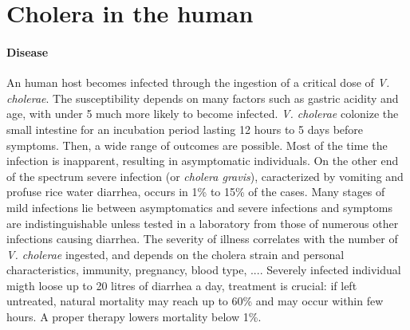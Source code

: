 \section{Cholera in the human} 
\paragraph{Disease} An human host becomes infected through the ingestion of a critical dose of \emph{V. cholerae}\cite{Kaper:Cholera:1995,Nelson:CholeraTransmissionHost:2009}. The susceptibility depends on many factors such as gastric acidity and age, with under 5 much more likely to become infected\cite{Sack:Cholera:2004}. \textit{V. cholerae} colonize the small intestine for an incubation period lasting 12 hours to 5 days\cite{Azman:IncubationPeriodCholera:2013} before symptoms. Then, a wide range of outcomes are possible. Most of the time the infection is inapparent, resulting in asymptomatic individuals. On the other end of the spectrum severe infection (or \emph{cholera gravis}), caracterized by vomiting and profuse rice water diarrhea, occurs in 1\% to 15\% of the cases. Many stages of mild infections lie between asymptomatics and severe infections and symptoms are indistinguishable unless tested in a laboratory from those of numerous other infections causing diarrhea\cite{King:InapparentInfectionsCholera:2008, Kaper:Cholera:1995, Nelson:CholeraTransmissionHost:2009,vandeLinde:ObservationsSpreadCholera:1965,Mccormack:CommunityStudyInapparent:1969}.  The severity of illness correlates with the number of \textit{V. cholerae} ingested\cite{Brouwer:DoseresponseRelationshipsEnvironmentally:2017}, and depends on the cholera strain and personal characteristics, immunity, pregnancy, blood type, ...\cite{WHO:CholeraVaccinesWHO:2017,Azman:IncubationPeriodCholera:2013}.%
Severely infected individual migth loose up to 20 litres  of diarrhea a day, treatment is crucial: if left untreated, natural mortality may reach up to 60\% and may occur within few hours. A proper therapy lowers mortality below 1\%\cite{Luquero:MortalityRatesCholera:2016}.
